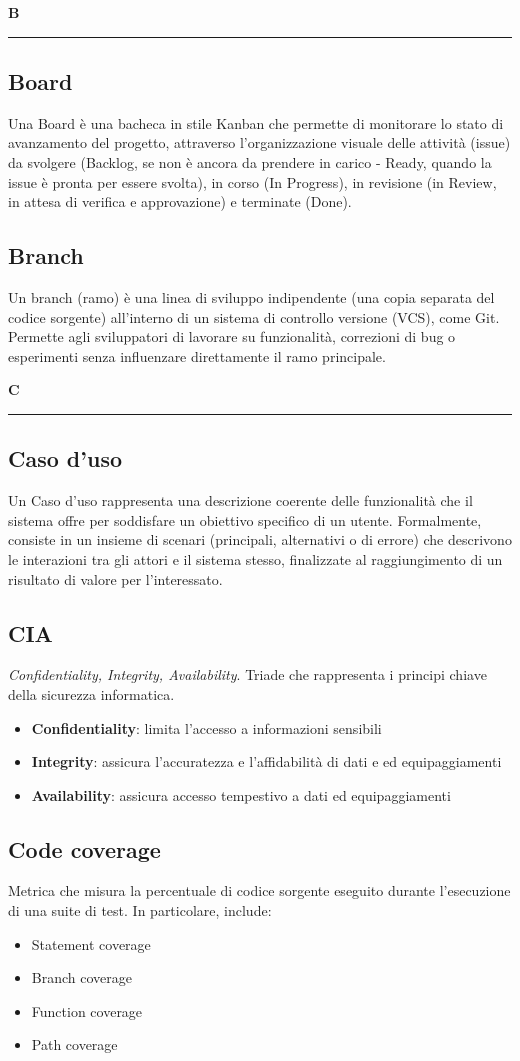\documentclass[a4paper, 11pt]{article}
\newcommand{\GlossarioLettera}[1]{%
    \clearpage
    \begin{center}
        {\LARGE \sffamily \color{AccentColor}\bfseries #1}
    \end{center}
    \addcontentsline{toc}{section}{#1}
    \textcolor{AccentColor}{\rule{\textwidth}{0.4pt}}
}
\newcommand{\nocontentsline}[3]{}
\newcommand{\term}[1]{\vspace*{.5cm}\bgroup\let\addcontentsline=\nocontentsline\subsection{#1}\label{term:#1}\egroup}
\begin{document}

\GlossarioLettera{B}
\term{Board}
Una Board è una bacheca in stile Kanban che permette di monitorare lo stato di avanzamento del progetto, attraverso l'organizzazione visuale delle attività (issue) da svolgere (Backlog, se non è ancora da prendere in carico - Ready, quando la issue è pronta per essere svolta), in corso (In Progress), in revisione (in Review, in attesa di verifica e approvazione) e terminate (Done).

\term{Branch}
Un branch (ramo) è una linea di sviluppo indipendente (una copia separata del codice sorgente) all'interno di un sistema di controllo versione (VCS), come Git. Permette agli sviluppatori di lavorare su funzionalità, correzioni di bug o esperimenti senza influenzare direttamente il ramo principale.

\GlossarioLettera{C}
\term{Caso d'uso}
Un Caso d'uso rappresenta una descrizione coerente delle funzionalità che il sistema offre per soddisfare un obiettivo specifico di un utente. Formalmente, consiste in un insieme di scenari (principali, alternativi o di errore) che descrivono le interazioni tra gli attori e il sistema stesso, finalizzate al raggiungimento di un risultato di valore per l'interessato.

\term{CIA}
\textit{Confidentiality, Integrity, Availability}. Triade che rappresenta i principi chiave della sicurezza informatica.
\begin{itemize}
	\item \textbf{Confidentiality}: limita l'accesso a informazioni sensibili
	\item \textbf{Integrity}: assicura l'accuratezza e l'affidabilità di dati e ed equipaggiamenti
	\item \textbf{Availability}: assicura accesso tempestivo a dati ed equipaggiamenti
\end{itemize}


\term{Code coverage}
Metrica che misura la percentuale di codice sorgente eseguito durante l'esecuzione di una suite di test. In particolare, include:
\begin{itemize}
	\item Statement coverage
	\item Branch coverage
	\item Function coverage
	\item Path coverage
\end{itemize}
\end{document}
